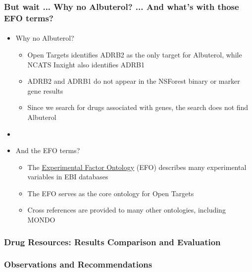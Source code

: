 \documentclass[aspectratio=169,xcolor=dvipsnames]{beamer}
\begin{document}
\begin{frame}
  \frametitle{But wait ... Why no Albuterol? ... And what's with those EFO terms?}
  \framesubtitle{}
  \begin{itemize}
  \item[] Why no Albuterol?
    \begin{itemize}
    \item Open Targets identifies ADRB2 as the only target for
      Albuterol, while NCATS Inxight also identifies ADRB1
    \item ADRB2 and ADRB1 do not appear in the NSForest binary or
      marker gene results
    \item Since we search for drugs associated with genes, the search
      does not find Albuterol
    \end{itemize}
  \item[]
  \item[] And the EFO terms?
    \begin{itemize}
    \item The \href{https://www.ebi.ac.uk/efo/}{Experimental Factor
      Ontology} (EFO) describes many experimental variables in EBI
      databases
    \item The EFO serves as the core ontology for Open Targets
    \item Cross references are provided to many other ontologies,
      including MONDO
    \end{itemize}
  \end{itemize}
\end{frame}

\begin{frame}
  \frametitle{Drug Resources: Results Comparison and Evaluation}
  \frametitle{}
  \framesubtitle{}
\end{frame}

\begin{frame}
  \frametitle{Observations and Recommendations}
  \frametitle{}
  \framesubtitle{}
\end{frame}



\end{document}
